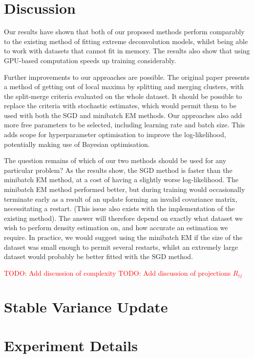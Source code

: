 \documentclass{article}
\newcommand{\todo}[1]{\textcolor{red}{TODO: #1}}
\begin{document}
\section{Discussion}

Our results have shown that both of our proposed methods perform comparably to the existing method of fitting extreme deconvolution models, whilst being able to work with datasets that cannot fit in memory.
The results also show that using GPU-based computation speeds up training considerably.

Further improvements to our approaches are possible.
The original paper presents a method of getting out of local maxima by splitting and merging clusters, with the split-merge criteria evaluated on the whole dataset.
It should be possible to replace the criteria with stochastic estimates, which would permit them to be used with both the SGD and minibatch EM methods.
Our approaches also add more free parameters to be selected, including learning rate and batch size.
This adds scope for hyperparameter optimisation to improve the log-likelihood, potentially making use of Bayesian optimisation.

The question remains of which of our two methods should be used for any particular problem?
As the results show, the SGD method is faster than the minibatch EM method, at a cost of having a slightly worse log-likelihood.
The minibatch EM method performed better, but during training would occasionally terminate early as a result of an update forming an invalid covariance matrix, necessitating a restart.
(This issue also exists with the implementation of the existing method).
The answer will therefore depend on exactly what dataset we wish to perform density estimation on, and how accurate an estimation we require.
In practice, we would suggest using the minibatch EM if the size of the dataset was small enough to permit several restarts, whilst an extremely large dataset would probably be better fitted with the SGD method.

\todo{Add discussion of complexity}
\todo{Add discussion of projections $R_{ij}$}



\appendix

\section{Stable Variance Update}
\label{apx:variance-rewrite}

\section{Experiment Details}
\end{document}
